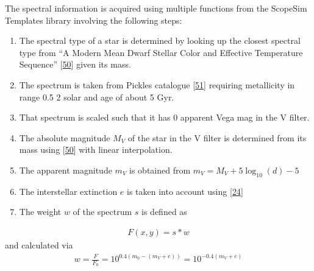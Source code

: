 \documentclass[letterpaper,10pt,english]{sphinxmanual}
\begin{document}
\sphinxAtStartPar
The spectral information is acquired using multiple functions from the ScopeSim Templates library involving the following steps:
\begin{enumerate}
%
\item {} 
\sphinxAtStartPar
The spectral type of a star is determined by looking up the closest spectral type from “A Modern Mean Dwarf Stellar Color and Effective Temperature Sequence” {[}\hyperlink{cite.NBodySimulation/Appendix:id51}{50}{]} given its mass.

\item {} 
\sphinxAtStartPar
The spectrum is taken from Pickles catalogue {[}\hyperlink{cite.NBodySimulation/Appendix:id52}{51}{]} requiring metallicity in range 0.5 \sphinxhyphen{} 2 solar and age of about 5 Gyr.

\item {} 
\sphinxAtStartPar
That spectrum is scaled such that it has 0 apparent Vega mag in the V filter.

\item {} 
\sphinxAtStartPar
The absolute magnitude \(M_V\) of the star in the V filter is determined from its mass using {[}\hyperlink{cite.NBodySimulation/Appendix:id51}{50}{]} with linear interpolation.

\item {} 
\sphinxAtStartPar
The apparent magnitude \(m_V\) is obtained from \(m_V = M_V + 5\log_{10}\left ( d \right )-5\)

\item {} 
\sphinxAtStartPar
The interstellar extinction \(e\) is taken into account using {[}\hyperlink{cite.NBodySimulation/Appendix:id53}{24}{]}

\item {} 
\sphinxAtStartPar
The weight \(w\) of the spectrum \(s\) is defined as

\end{enumerate}
\begin{equation*}
\begin{split}F\left (x,y \right ) = s * w\end{split}
\end{equation*}
\sphinxAtStartPar
and calculated via
\begin{equation*}
\begin{split}w = \frac{F}{F_0} = 10^{0.4\left ( m_0-(m_V+e) \right )}=10^{-0.4 (m_V+e)}\end{split}
\end{equation*}
\end{document}

